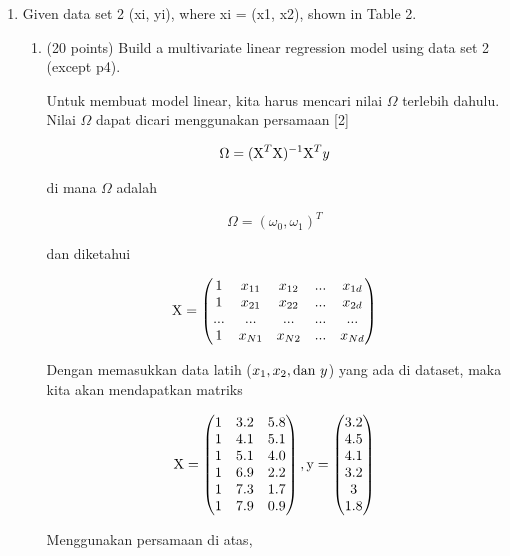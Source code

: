 \documentclass[12pt]{article}%
\begin{document}
\begin{enumerate}
	\item Given data set 2 (xi, yi), where xi = (x1, x2), shown in Table 2.
	\begin{enumerate}
		\item (20 points) Build a multivariate linear regression model using data set 2 (except p4).
		\par Untuk membuat model linear, kita harus mencari nilai $\Omega$ terlebih dahulu. Nilai $\Omega$ dapat dicari menggunakan persamaan [2]

			\[\Omega = (\textup{X}^T\textup{X})^{-1}\textup{X}^Ty\]

		\par di mana $\Omega$ adalah 

			\[\Omega = (\omega_0, \omega_1)^T\]

		\par dan diketahui

			\[\textup{X} = \begin{pmatrix} 1& x_{11} & x_{12} & ... & x_{1d}\\ 1& x_{21} & x_{22} & ... & x_{2d} \\ ... & ... & ... & ... & ... \\ 1 & x_{N1} & x_{N2} & ... & x_{Nd} \end{pmatrix}\]

		\par Dengan memasukkan data latih ($x_1,x_2, \textup{dan} \ y$) yang ada di dataset, maka kita akan mendapatkan matriks

			\[\textup{X} = \begin{pmatrix} 1 & 3.2 & 5.8\\ 1 & 4.1 & 5.1\\ 1 & 5.1 & 4.0\\ 1 & 6.9 & 2.2\\ 1 & 7.3 & 1.7\\ 1 & 7.9 & 0.9 \end{pmatrix} , \textup{y} = \begin{pmatrix} 3.2\\ 4.5\\ 4.1\\ 3.2\\ 3\\ 1.8 \end{pmatrix}\]

		\par Menggunakan persamaan di atas,


\end{enumerate}
\end{enumerate}
\end{document}
